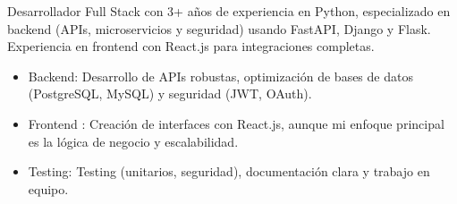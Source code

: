 
\begin{cvparagraph}
    Desarrollador Full Stack con 3+ años de experiencia en Python, especializado en backend (APIs, microservicios y seguridad) usando FastAPI, Django y Flask. Experiencia en frontend con React.js para integraciones completas.

    \begin{itemize}
        \item Backend: Desarrollo de APIs robustas, optimización de bases de datos (PostgreSQL, MySQL) y seguridad (JWT, OAuth).
        \item Frontend : Creación de interfaces con React.js, aunque mi enfoque principal es la lógica de negocio y escalabilidad.
        \item Testing: Testing (unitarios, seguridad), documentación clara y trabajo en equipo.
    
    \end{itemize}

\end{cvparagraph}
